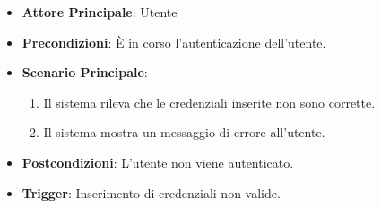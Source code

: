 \begin{itemize}
    \item \textbf{Attore Principale}: Utente
    \item \textbf{Precondizioni}: È in corso l'autenticazione dell'utente.
    \item \textbf{Scenario Principale}:
    \begin{enumerate}
        \item Il sistema rileva che le credenziali inserite non sono corrette.
        \item Il sistema mostra un messaggio di errore all'utente.
    \end{enumerate}
    \item \textbf{Postcondizioni}: L'utente non viene autenticato.
    \item \textbf{Trigger}: Inserimento di credenziali non valide.
\end{itemize}

